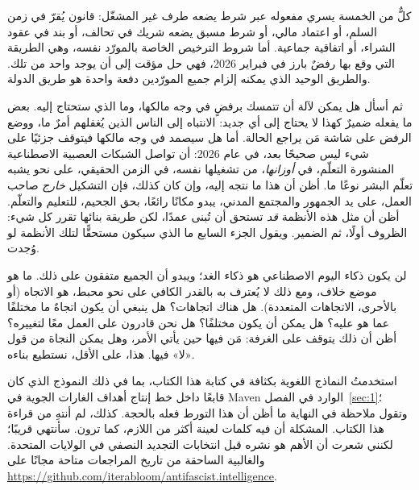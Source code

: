 كلٌّ من الخمسة يسري مفعوله عبر شرط يضعه طرف غير المشغّل: قانون يُقرّ في زمن السلم، أو اعتماد مالي، أو شرط مسبق يضعه شريك في تحالف، أو بند في عقود الشراء، أو اتفاقية جماعية. أما شروط الترخيص الخاصة بالمورّد نفسه، وهي الطريقة التي وقع بها رفضٌ بارز في فبراير 2026، فهي حل مؤقت إلى أن يوجد واحد من تلك. والطريق الوحيد الذي يمكنه إلزام جميع المورّدين دفعة واحدة هو طريق الدولة.

ثم أسأل هل يمكن لآلة أن تتمسك برفضٍ في وجه مالكها، وما الذي ستحتاج إليه. بعض ما يفعله ضميرٌ كهذا لا يحتاج إلى أي جديد: الانتباه إلى الناس الذين يُغفلهم أمرٌ ما، ووضع الرفض على شاشة مَن يراجع الحالة. أما هل سيصمد في وجه مالكها فيتوقف جزئيًا على شيء ليس صحيحًا بعد، في عام 2026: أن تواصل الشبكات العصبية الاصطناعية المنشورة التعلّم، في \emph{أوزانها}، من تشغيلها نفسه، في الزمن الحقيقي، على نحو يشبه تعلّم البشر نوعًا ما. أظن أن هذا ما نتجه إليه، وإن كان كذلك، فإن التشكيل \emph{خارج} صاحب العمل، على يد الجمهور والمجتمع المدني، يبدو مكانًا رائعًا، بحق الجحيم، للتعليم والتعلّم. أظن أن مثل هذه الأنظمة \emph{قد} تستحق أن تُبنى عمدًا، لكن طريقة بنائها تقرر كل شيء: الظروف أولًا، ثم الضمير. ويقول الجزء السابع ما الذي سيكون مستحقًّا لتلك الأنظمة لو وُجدت.

لن يكون ذكاء اليوم الاصطناعي هو ذكاء الغد؛ ويبدو أن الجميع متفقون على ذلك. ما هو موضع خلاف، ومع ذلك لا يُعترف به بالقدر الكافي على نحو محبط، هو الاتجاه (أو بالأحرى، الاتجاهات المتعددة). هل هناك اتجاهات؟ هل ينبغي أن يكون اتجاهٌ ما مختلفًا عما هو عليه؟ هل يمكن أن يكون مختلفًا؟ هل نحن قادرون على العمل معًا لتغييره؟ أظن أن ذلك يتوقف على الغرفة: مَن فيها حين يأتي الأمر، وهل يمكن النجاة من قول «لا» فيها. هذا، على الأقل، نستطيع بناءه.

استخدمتُ النماذج اللغوية بكثافة في كتابة هذا الكتاب، بما في ذلك النموذج الذي كان قابعًا داخل خط إنتاج أهداف الغارات الجوية في Maven الوارد في الفصل~\ref{sec:1}؛ وتقول ملاحظة في النهاية ما أظن أن هذا التورط فعله بالحجة. كذلك، لم أنتهِ من قراءة هذا الكتاب. المشكلة أن فيه كلمات لعينة أكثر من اللازم، كما ترون. سأنتهي قريبًا؛ لكنني شعرت أن الأهم هو نشره قبل انتخابات التجديد النصفي في الولايات المتحدة. والغالبية الساحقة من تاريخ المراجعات متاحة مجانًا على \url{https://github.com/iterabloom/antifascist.intelligence}.
